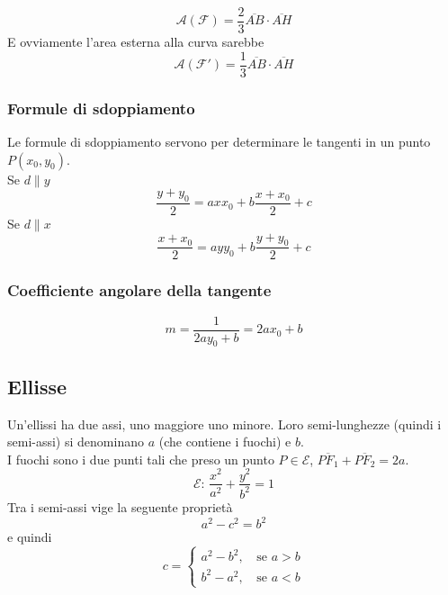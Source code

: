 \begin{equation*}
\mathscr{A}(\mathscr{F}) = \frac{2}{3}\overline{AB}\cdot\overline{AH}
\end{equation*}
E ovviamente l'area esterna alla curva sarebbe
\begin{equation*}
\mathscr{A}(\mathscr{F}') = \frac{1}{3}\overline{AB}\cdot\overline{AH}
\end{equation*}

\subsubsection{Formule di sdoppiamento}
Le formule di sdoppiamento servono per determinare le tangenti in un punto $P(x_0,y_0)$.\\
Se $d\|y$
\begin{equation*}
\frac{y+y_0}{2}=axx_0+b\frac{x+x_0}{2}+c
\end{equation*}
Se $d\|x$
\begin{equation*}
\frac{x+x_0}{2}=ayy_0+b\frac{y+y_0}{2}+c
\end{equation*}

\subsubsection{Coefficiente angolare della tangente}
\begin{equation*}
m = \frac{1}{2ay_0+b} = 2ax_0+b
\end{equation*}

\subsection{Ellisse}\label{subsec:geomanal:ellisse}
\begin{center}
\end{center}
Un'ellissi ha due assi, uno maggiore uno minore. Loro semi-lunghezze (quindi i semi-assi) si 
denominano $a$ (che contiene i fuochi) e $b$.\\
I fuochi sono i due punti tali che preso un punto $P\in\mathscr{E}$, 
$\overline{PF_1}+\overline{PF_2} = 2a$.
\begin{equation*}
\mathscr{E}:\,\frac{x^2}{a^2}+\frac{y^2}{b^2}=1
\end{equation*}
Tra i semi-assi vige la seguente proprietà
\begin{equation*}
a^2-c^2=b^2
\end{equation*}
e quindi
\begin{equation*}
c = \begin{cases}
a^2-b^2,\, &\text{se } a > b\\
b^2-a^2,\, &\text{se } a < b
\end{cases}
\end{equation*}

